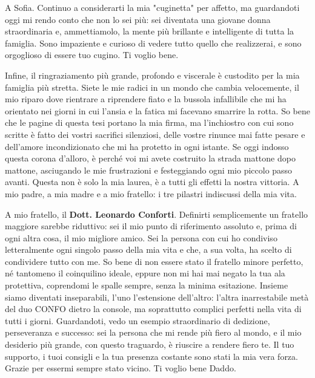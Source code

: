 A Sofia. Continuo a considerarti la mia "cuginetta" per affetto, ma guardandoti oggi mi rendo conto che non lo sei più: sei diventata una giovane donna straordinaria e, ammettiamolo, la mente più brillante e intelligente di tutta la famiglia. Sono impaziente e curioso di vedere tutto quello che realizzerai, e sono orgoglioso di essere tuo cugino. Ti voglio bene.

\vspace{1em}

\noindent
Infine, il ringraziamento più grande, profondo e viscerale è custodito per la mia famiglia più stretta. Siete le mie radici in un mondo che cambia velocemente, il mio riparo dove rientrare a riprendere fiato e la bussola infallibile che mi ha orientato nei giorni in cui l'ansia e la fatica mi facevano smarrire la rotta. So bene che le pagine di questa tesi portano la mia firma, ma l'inchiostro con cui sono scritte è fatto dei vostri sacrifici silenziosi, delle vostre rinunce mai fatte pesare e dell'amore incondizionato che mi ha protetto in ogni istante. Se oggi indosso questa corona d'alloro, è perché voi mi avete costruito la strada mattone dopo mattone, asciugando le mie frustrazioni e festeggiando ogni mio piccolo passo avanti. Questa non è solo la mia laurea, è a tutti gli effetti la nostra vittoria. A mio padre, a mia madre e a mio fratello: i tre pilastri indiscussi della mia vita.


\noindent
A mio fratello, il \textbf{Dott. Leonardo Conforti}.
Definirti semplicemente un fratello maggiore sarebbe riduttivo: sei il mio punto di riferimento assoluto e, prima di ogni altra cosa, il mio migliore amico. Sei la persona con cui ho condiviso letteralmente ogni singolo passo della mia vita e che, a sua volta, ha scelto di condividere tutto con me. So bene di non essere stato il fratello minore perfetto, né tantomeno il coinquilino ideale, eppure non mi hai mai negato la tua ala protettiva, coprendomi le spalle sempre, senza la minima esitazione. Insieme siamo diventati inseparabili, l'uno l'estensione dell'altro: l'altra inarrestabile metà del duo CONFO dietro la console, ma soprattutto complici perfetti nella vita di tutti i giorni. Guardandoti, vedo un esempio straordinario di dedizione, perseveranza e successo: sei la persona che mi rende più fiero al mondo, e il mio desiderio più grande, con questo traguardo, è riuscire a rendere fiero te. Il tuo supporto, i tuoi consigli e la tua presenza costante sono stati la mia vera forza. Grazie per essermi sempre stato vicino. Ti voglio bene Daddo.

